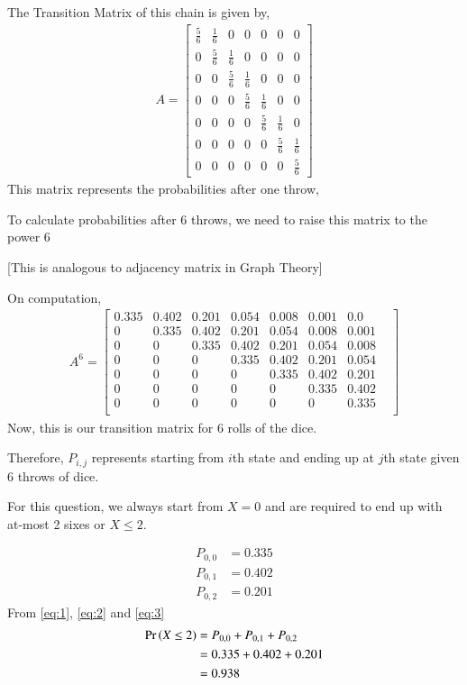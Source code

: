 \documentclass[journal,12pt,twocolumn]{IEEEtran}
\begin{document}
The Transition Matrix of this chain is given by,
\begin{align}
A=\begin{bmatrix}
\frac{5}{6} & \frac{1}{6} & 0 & 0 & 0 & 0 & 0\\[6pt]
0 & \frac{5}{6} & \frac{1}{6} & 0 & 0 & 0 & 0\\[6pt]
0 & 0 & \frac{5}{6} & \frac{1}{6} & 0 & 0 & 0\\[6pt]
0 & 0 & 0 & \frac{5}{6} & \frac{1}{6} & 0 & 0\\[6pt]
0 & 0 & 0 & 0 & \frac{5}{6} & \frac{1}{6} & 0\\[6pt]
0 & 0 & 0 & 0 & 0 & \frac{5}{6} & \frac{1}{6}\\[6pt]
0 & 0 & 0 & 0 & 0 & 0 & \frac{5}{6}
\end{bmatrix}
\end{align}
This matrix represents the probabilities after one throw,

To calculate probabilities after 6 throws, we need to raise this matrix to the power 6

[This is analogous to adjacency matrix in Graph Theory]

On computation,
\begin{align}
  A^6 =   \begin{bmatrix}
  0.335 & 0.402 & 0.201 & 0.054 & 0.008 & 0.001 & 0.0 & \\
0 & 0.335 & 0.402 & 0.201 & 0.054 & 0.008 & 0.001 & \\
0 & 0 & 0.335 & 0.402 & 0.201 & 0.054 & 0.008 & \\
0 & 0 & 0 & 0.335 & 0.402 & 0.201 & 0.054 & \\
0 & 0 & 0 & 0 & 0.335 & 0.402 & 0.201 & \\
0 & 0 & 0 & 0 & 0 & 0.335 & 0.402 & \\
0 & 0 & 0 & 0 & 0 & 0 & 0.335 & \\
  \end{bmatrix}
\end{align}
Now, this is our transition matrix for 6 rolls of the dice.

Therefore, $P_{i,j}$ represents starting from $i$th state and ending up at $j$th state given 6 throws of dice.

For this question, we always start from $X=0$ and are required to end up with at-most 2 sixes or $X \le 2$.

\begin{align}
\label{eq:1}
    P_{0,0} &= 0.335\\
    \label{eq:2}
    P_{0,1} &= 0.402\\
    \label{eq:3}
    P_{0,2} &= 0.201
\end{align}
From \eqref{eq:1}, \eqref{eq:2} and \eqref{eq:3}
\begin{align}
    \Pr\left(X \le 2\right) &= P_{0,0}+P_{0,1}+P_{0,2}\\
    &= 0.335+0.402+0.201\\
    &= 0.938
\end{align}
\end{document}
